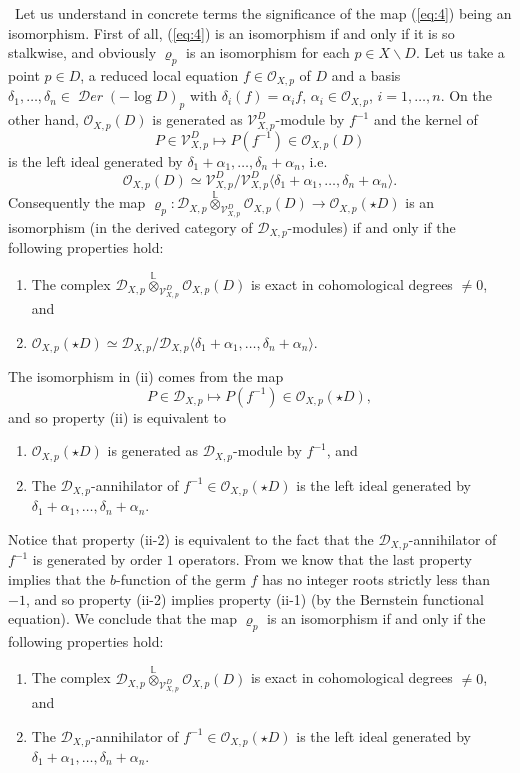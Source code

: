 \documentclass[12pt]{article}
\newcommand{\Lotimes}{\stackrel{\mathbb{L}}{\otimes}}
\DeclareMathOperator{\fDer}{\mathcal{D}\mathit{er}}
\newcommand{\OO}{\mathcal{O}}
\newcommand{\DD}{\mathcal{D}}
\newcommand{\VV}{\mathcal{V}}
\newcommand\calV{\mathcal{V}}
\newcommand\ssm{\smallsetminus}
\newcounter{numero}[section]
\renewcommand{\thenumero}{(\arabic{section}.\arabic{numero})}
\newenvironment{nota}{\medskip
\refstepcounter{numero}\noindent {\sc  \thenumero\ Remark.}\
}{\vspace{1ex}\par}
\begin{document}
\begin{nota}\label{lctconcrete}Let us understand in concrete terms the significance of the map (\ref{eq:4}) being an isomorphism.
First of all, (\ref{eq:4}) is an isomorphism if and only if it is so stalkwise, and obviously $\varrho_p$ is an isomorphism for each $p\in X \ssm D$. Let us take a point $p\in D$, a reduced local equation $f\in \OO_{X,p}$ of $D$ and a basis $\delta_1,\dots,\delta_n\in \fDer(-\log D)_p$ with $\delta_i(f) = \alpha_i f$, $\alpha_i\in \OO_{X,p}$, $i=1,\dots,n$.
On the other hand, $\OO_{X,p}(D)$ is generated as $\VV^D_{X,p}$-module by $f^{-1}$ and the kernel of
$$
P \in \VV^D_{X,p} \longmapsto P(f^{-1}) \in \OO_{X,p}(D)
$$
is the left ideal generated by $\delta_1 + \alpha_1,\dots,\delta_n+\alpha_n$, i.e.
$$\OO_{X,p}(D) \simeq \VV^D_{X,p}/\calV^D_{X,p} \langle \delta_1 + \alpha_1,\dots,\delta_n+\alpha_n\rangle.$$
Consequently the map $\varrho_p:\DD_{X,p} \Lotimes_{\VV^D_{X,p}} \OO_{X,p}(D) \longrightarrow \OO_{X,p}(\star D)$ is an isomorphism (in the derived category of $\DD_{X,p}$-modules) if and only if the following properties hold:
\begin{enumerate}
\item[(i)] The complex $\DD_{X,p} \Lotimes_{\VV^D_{X,p}} \OO_{X,p}(D)$ is exact in cohomological degrees $\neq 0$, and
\item[(ii)] $\OO_{X,p}(\star D) \simeq \DD_{X,p}/\DD_{X,p} \langle \delta_1 + \alpha_1,\dots,\delta_n+\alpha_n\rangle$.
\end{enumerate}
The isomorphism in (ii) comes from the map
$$
P \in \DD_{X,p} \longmapsto P(f^{-1}) \in \OO_{X,p}(\star D),
$$
and so property (ii) is equivalent to
\begin{enumerate}
\item[(ii-1)] $\OO_{X,p}(\star D)$ is generated as $\DD_{X,p}$-module by $f^{-1}$, and
\item[(ii-2)] The $\DD_{X,p}$-annihilator of $f^{-1} \in \OO_{X,p}(\star D)$ is the left ideal generated by $\delta_1 + \alpha_1,\dots,\delta_n+\alpha_n$.
\end{enumerate}
Notice that property (ii-2) is equivalent to the fact that the $\DD_{X,p}$-annihilator of $f^{-1}$ is generated by order $1$ operators. From \cite{torrelli_2004} we know that the last property implies that the $b$-function of the germ $f$ has no integer roots strictly less than $-1$, and so property (ii-2) implies property (ii-1) (by the Bernstein functional equation). We conclude that the map
$\varrho_p$ is an isomorphism if and only if the following properties hold:
\begin{enumerate}
\item[(i)] The complex $\DD_{X,p} \Lotimes_{\VV^D_{X,p}} \OO_{X,p}(D)$ is exact in cohomological degrees $\neq 0$, and
\item[(ii-2)] The $\DD_{X,p}$-annihilator of $f^{-1} \in \OO_{X,p}(\star D)$ is the left ideal generated by $\delta_1 + \alpha_1,\dots,\delta_n+\alpha_n$.
\end{enumerate}
\end{nota}
\end{document}

